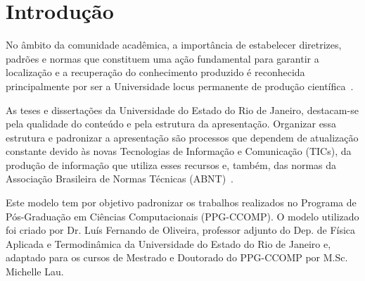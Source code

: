 \documentclass[a4paper,12pt,oneside,onecolumn,final,fleqn]{repUERJ}
\begin{document}




\sumario


\mainmatter %

\chapter*{Introdução} %

No âmbito da comunidade acadêmica, a importância de estabelecer diretrizes, padrões e normas que constituem uma ação fundamental para garantir a localização e a recuperação do conhecimento produzido é reconhecida principalmente por ser a Universidade locus permanente de produção científica~\cite{bib:roteiro}.

As teses e dissertações da Universidade do Estado do Rio de Janeiro, destacam-se pela qualidade do conteúdo e pela estrutura da apresentação. Organizar essa estrutura e padronizar a apresentação são processos que dependem de atualização constante devido às novas Tecnologias de Informação e Comunicação (TICs), da produção de informação que utiliza esses recursos e, também, das normas da Associação Brasileira de Normas Técnicas (ABNT)~\cite{bib:roteiro}.

Este modelo tem por objetivo padronizar os trabalhos realizados no Programa de Pós-Graduação em Ciências Computacionais (PPG-CCOMP). O modelo utilizado foi criado por Dr. Luís Fernando de Oliveira, professor adjunto do Dep. de Física Aplicada e Termodinâmica da Universidade do Estado do Rio de Janeiro e, adaptado para os cursos de Mestrado e Doutorado do PPG-CCOMP por M.Sc. Michelle Lau.
\end{document}
